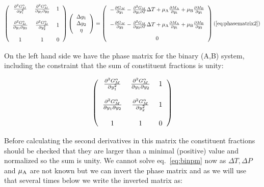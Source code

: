 \documentclass[12pt]{article}
\begin{document}
\[
\left(
\begin{tabular}{ccc}
$\frac{\partial^2 G_M^{\alpha}}{\partial y^2_{1}}$ &
$\frac{\partial^2 G_M^{\alpha}}{\partial y_{1}\partial y_{2}}$ & 1 \\
\\
$\frac{\partial^2 G_M^{\alpha}}{\partial y_{1}\partial y_{2}}$ &
$\frac{\partial^2 G_M^{\alpha}}{\partial y^2_{2}}$ & 1\\
\\
1 & 1 & 0\\
\end{tabular}
\right)
\left(
\begin{tabular}{c}
$\Delta y_{1}$\\
$\Delta y_{2}$\\
$\eta$
\end{tabular}
\right)
=
\left(
\begin{tabular}{c}
$-\frac{\partial G_M}{\partial y_{1}}
-\frac{\partial^2 G_M}{\partial y_{1}\partial T}\Delta T
+\mu_{\rm A}\frac{\partial M_{\rm A}}{\partial y_{1}}
+\mu_{\rm B}\frac{\partial M_{\rm B}}{\partial y_{1}}$\\
\\
$-\frac{\partial G_M}{\partial y_{2}}
-\frac{\partial^2 G_M}{\partial y_{2}\partial T}\Delta T
+\mu_{\rm A}\frac{\partial M_{\rm A}}{\partial y_{1}}
+\mu_{\rm B}\frac{\partial M_{\rm B}}{\partial y_{2}}$\\
\\
0
\end{tabular}
\right)\label{eq:binpm}
\\ (\ref{eq:phasematrix2})
\]


On the left hand side we have the phase matrix for the binary (A,B)
system, including the constraint that the sum of constituent fractions
is unity:

\[ \left(
\begin{tabular}{ccc}
$\frac{\partial^2 G_M^{\alpha}}{\partial y^2_{1}}$ &
$\frac{\partial^2 G_M^{\alpha}}{\partial y_{1}\partial y_{2}}$ & 1 \\
\\
$\frac{\partial^2 G_M^{\alpha}}{\partial y_{1}\partial y_{2}}$ &
$\frac{\partial^2 G_M^{\alpha}}{\partial y^2_{2}}$ & 1\\
\\
1 & 1 & 0\\
\end{tabular}
\right) \]

Before calculating the second derivatives in this matrix the
constituent fractions should be checked that they are larger than a
minimal (positive) value and normalized so the sum is unity.  We
cannot solve eq.~\ref{eq:binpm} now as $\Delta T, \Delta P$ and
$\mu_{\rm A}$ are not known but we can invert the phase matrix and as
we will use that several times below we write the inverted matrix as:
\end{document}
